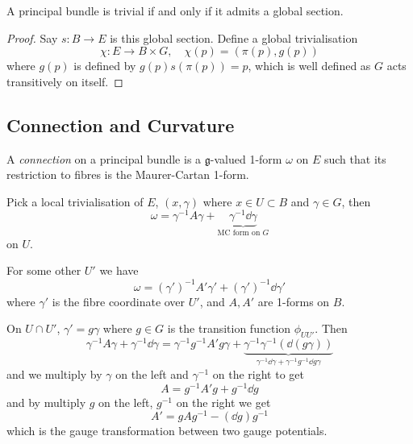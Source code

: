 \documentclass[a4paper,11pt]{article}
\begin{document}
    \begin{prop}
        A principal bundle is trivial if and only if it admits a global section.
    \end{prop}
    \begin{proof}
        Say $s : B \to E$ is this global section. Define a global trivialisation 
        \begin{equation}
            \chi : E \to B \times G, \quad \chi(p) = (\pi(p), g(p))
        \end{equation}
        where $g(p)$ is defined by $g(p) s(\pi(p)) = p$, which is well defined as $G$ acts transitively on itself. 
    \end{proof}

    \subsection{Connection and Curvature}
    \begin{defi}[Connection]
        A \emph{connection} on a principal bundle is a $\mathfrak{g}$-valued 1-form $\omega$ on $E$ such that its restriction to fibres is the Maurer-Cartan 1-form. 
    \end{defi}

    Pick a local trivialisation of $E$, $(x, \gamma)$ where $x \in U \subset B$ and $\gamma \in G$, then 
    \begin{equation}
        \omega = \gamma^{-1} A \gamma + \underbrace{\gamma^{-1} \dd{\gamma}}_{\text{MC form on }G} \label{eq:connection on E}
    \end{equation}
    on $U$.
    
    For some other $U'$ we have 
    \begin{equation}
        \omega = (\gamma')^{-1} A' \gamma' + (\gamma')^{-1} \dd{\gamma'}
    \end{equation}
    where $\gamma'$ is the fibre coordinate over $U'$, and $A,A'$ are 1-forms on $B$.
    
    On $U \cap U'$, $\gamma' = g \gamma$ where $g \in G$ is the transition function $\phi_{U U'}$. Then 
    \begin{equation}
        \gamma^{-1} A \gamma + \gamma^{-1} \dd{\gamma} = \gamma^{-1} g^{-1} A' g \gamma + \underbrace{\gamma^{-1} \gamma^{-1} \left( \dd{(g \gamma)} \right)}_{\gamma^{-1} \dd{\gamma} + \gamma^{-1} g^{-1} \dd{g} \gamma}
    \end{equation}
    and we multiply by $\gamma$ on the left and $\gamma^{-1}$ on the right to get 
    \begin{equation}
        A = g^{-1} A' g + g^{-1} \dd{g} 
    \end{equation}
    and by multiply $g$ on the left, $g^{-1}$ on the right we get 
    \begin{equation}
        \boxed{A' = g A g^{-1} - (\dd{g})g^{-1}} \label{eq:conn-gauge-tfm}
    \end{equation}
    which is the gauge transformation between two gauge potentials. 
\end{document}
